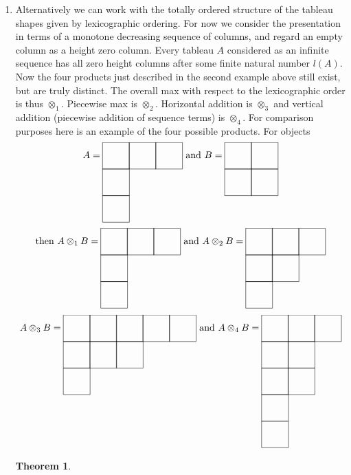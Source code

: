 \documentclass{tac}
\newtheorem{theorem}{Theorem}
\begin{document}
{\begin{enumerate}
   Since we are working with sequences there are also inherited max products as dicussed in the first example.
   The new max with respect to the height preordering is defined as $\max(A,B) = A$ if $B\le A$ and $ = B$ otherwise.
   The piecewise application of max with respect to the ordering of natural numbers results in taking a union
   of the two tableau shapes. 
   Above, $\max(A,B) = B$ and the piecewise max becomes
   $$
   \xymatrix@W=1.8pc @H=1.8pc @R=0pc @C=0pc @*[F-]{~&~&~&~\\~\\~}
   $$
   In the height preordered category both of these latter products are equivalent to the horizontal composition $\otimes_1.$
\item   
Alternatively we can work with the totally ordered structure of the 
tableau shapes given by lexicographic ordering. 
For now we consider the presentation in terms of a monotone decreasing sequence of columns, and regard
an empty column as a height zero column. Every tableau $A$ considered
as an infinite sequence has all zero height columns after some finite natural number $l(A)$. 
Now the four products just described in the second example above still exist, but are truly
distinct. 
The overall max with respect to the lexicographic order is thus $\otimes_1.$ Piecewise max is
$\otimes_2.$ Horizontal addition is $\otimes_3$ and vertical addition  
(piecewise addition of sequence terms) is $\otimes_4.$ 
For comparison purposes here is an example of the four possible products.
For objects
$$
A=\xymatrix@W=1.8pc @H=1.8pc @R=0pc @C=0pc @*[F-]{~&~&~\\~\\~}
\text{ and } B = \xymatrix@W=1.8pc @H=1.8pc @R=0pc @C=0pc @*[F-]{~&~\\~&~}
$$
$$
\text{then } A\otimes_1 B = \xymatrix@W=1.8pc @H=1.8pc @R=0pc @C=0pc @*[F-]{~&~&~\\~\\~}
\text{ and } A\otimes_2 B = \xymatrix@W=1.8pc @H=1.8pc @R=0pc @C=0pc @*[F-]{~&~&~\\~&~\\~}
$$
$$
 A\otimes_3 B = \xymatrix@W=1.8pc @H=1.8pc @R=0pc @C=0pc @*[F-]{~&~&~&~&~\\~&~&~\\~}
\text{ and } A\otimes_4 B = \xymatrix@W=1.8pc @H=1.8pc @R=0pc @C=0pc @*[F-]{~&~&~\\~&~\\~&~\\~\\~}
$$  
\begin{theorem}\label{modseq}

\end{theorem}
\end{enumerate}}
\end{document}
